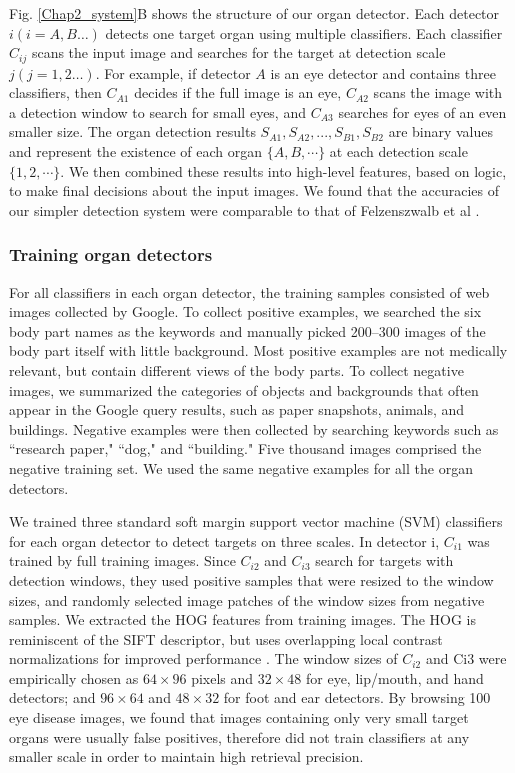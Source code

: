 Fig. {\ref{Chap2_system}}B shows the structure of our organ detector. Each
detector $i (i=A, B…)$ detects one target organ using multiple
classifiers. Each classifier $C_{ij}$ scans the input image and searches
for the target at detection scale $j ( j=1, 2…)$. For example, if
detector $A$ is an eye detector and contains three classifiers, then
$C_{A1}$ decides if the full image is an eye, $C_{A2}$ scans the image with
a detection window to search for small eyes, and $C_{A3}$ searches
for eyes of an even smaller size. The organ detection results
${S_{A1}, S_{A2}, ..., S_{B1}, S_{B2}}$ are binary values and represent the
existence of each organ $\{A,B,\cdots\}$ at each detection scale $\{1,2,\cdots\}$.
We then combined these results into high-level features,
based on logic, to make final decisions about the input images.
We found that the accuracies of our simpler detection system
were comparable to that of Felzenszwalb et al \cite{felzenszwalb2010object}.



\subsubsection{Training organ detectors}
For all classifiers in each organ detector, the training samples
consisted of web images collected by Google. To collect positive
examples, we searched the six body part names as the keywords
and manually picked 200--300 images of the body part itself
with little background. Most positive examples are not medically
relevant, but contain different views of the body parts. To
collect negative images, we summarized the categories of objects
and backgrounds that often appear in the Google query results,
such as paper snapshots, animals, and buildings. Negative examples
were then collected by searching keywords such as ``research
paper," ``dog," and ``building." Five thousand images comprised
the negative training set. We used the same negative examples
for all the organ detectors.

We trained three standard soft margin support vector
machine (SVM) classifiers for each organ detector to detect
targets on three scales. In detector i, $C_{i1}$ was trained by full
training images. Since $C_{i2}$ and $C_{i3}$ search for targets with detection
windows, they used positive samples that were resized to
the window sizes, and randomly selected image patches of the
window sizes from negative samples. We extracted the HOG
features \cite{dalal2005histograms} from training images. The HOG is reminiscent of the
SIFT descriptor, but uses overlapping local contrast normalizations
for improved performance \cite{dalal2005histograms}. The window sizes of $C_{i2}$ and
Ci3 were empirically chosen as $64 \times 96$ pixels and $32 \times 48$ for
eye, lip/mouth, and hand detectors; and $96 \times 64$ and $48 \times 32$ for
foot and ear detectors. By browsing 100 eye disease images, we
found that images containing only very small target organs were
usually false positives, therefore did not train classifiers at any
smaller scale in order to maintain high retrieval precision.



